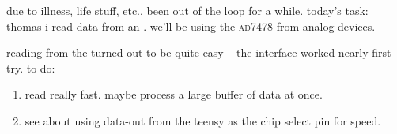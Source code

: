 due to illness, life stuff, etc., been out of the loop for a while. today's
task: thomas \amp i read data from an \adc. we'll be using the \textsc{ad7478}
from analog devices.

reading from the \adc turned out to be quite easy -- the \spi interface worked
nearly first try. to do:
\begin{enumerate}
	\item read really fast. maybe process a large buffer of \spi data at
	once.
	\item see about using data-out from the teensy as the chip select pin
	for speed.
\end{enumerate}
